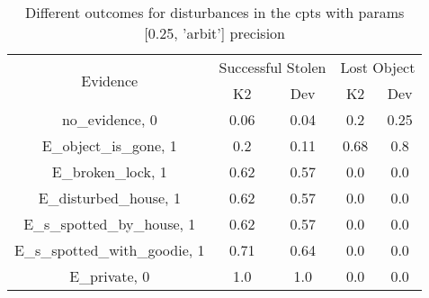 \begin{table}\begin{tabular}{c|cc|cc}\toprule\multirow{2}{*}{Evidence} & \multicolumn{2}{c}{Successful Stolen} & \multicolumn{2}{c}{Lost Object} \\& {K2} & {Dev} & {K2} & {Dev} \\\midrule
no\_evidence, 0 & \cellcolor{Bittersweet}0.06&\cellcolor{Bittersweet}0.04&\cellcolor{Bittersweet}0.2&\cellcolor{Bittersweet}0.25\\E\_object\_is\_gone, 1 & \cellcolor{Bittersweet}0.2&\cellcolor{Bittersweet}0.11&\cellcolor{Bittersweet}0.68&\cellcolor{Bittersweet}0.8\\E\_broken\_lock, 1 & \cellcolor{Bittersweet}0.62&\cellcolor{Bittersweet}0.57&0.0&0.0\\E\_disturbed\_house, 1 & \cellcolor{Bittersweet}0.62&\cellcolor{Bittersweet}0.57&0.0&0.0\\E\_s\_spotted\_by\_house, 1 & \cellcolor{Bittersweet}0.62&\cellcolor{Bittersweet}0.57&0.0&0.0\\E\_s\_spotted\_with\_goodie, 1 & \cellcolor{Bittersweet}0.71&\cellcolor{Bittersweet}0.64&0.0&0.0\\E\_private, 0 & 1.0&1.0&0.0&0.0\\\bottomrule\end{tabular}\caption{Different outcomes for disturbances in the cpts with params [0.25, 'arbit'] precision}\end{table}
